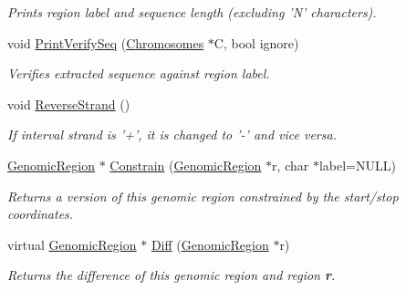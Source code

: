 \begin{CompactItemize}
\begin{CompactList}\small\item\em Prints region label and sequence length (excluding 'N' characters). \item\end{CompactList}\item 
\hypertarget{classGenomicRegion_77fa696d55d538b365d15a7a30391132}{
void \hyperlink{classGenomicRegion_77fa696d55d538b365d15a7a30391132}{PrintVerifySeq} (\hyperlink{classChromosomes}{Chromosomes} $\ast$C, bool ignore)}
\label{classGenomicRegion_77fa696d55d538b365d15a7a30391132}

\begin{CompactList}\small\item\em Verifies extracted sequence against region label. \item\end{CompactList}\item 
\hypertarget{classGenomicRegion_9304039f70c5110b961cc9de77974d09}{
void \hyperlink{classGenomicRegion_9304039f70c5110b961cc9de77974d09}{ReverseStrand} ()}
\label{classGenomicRegion_9304039f70c5110b961cc9de77974d09}

\begin{CompactList}\small\item\em If interval strand is '+', it is changed to '-' and vice versa. \item\end{CompactList}\item 
\hypertarget{classGenomicRegion_50f5ba99404da1cdae6a8632a19ff837}{
\hyperlink{classGenomicRegion}{GenomicRegion} $\ast$ \hyperlink{classGenomicRegion_50f5ba99404da1cdae6a8632a19ff837}{Constrain} (\hyperlink{classGenomicRegion}{GenomicRegion} $\ast$r, char $\ast$label=NULL)}
\label{classGenomicRegion_50f5ba99404da1cdae6a8632a19ff837}

\begin{CompactList}\small\item\em Returns a version of this genomic region constrained by the start/stop coordinates. \item\end{CompactList}\item 
\hypertarget{classGenomicRegion_44cf789afda4e77749019045050e5ec7}{
virtual \hyperlink{classGenomicRegion}{GenomicRegion} $\ast$ \hyperlink{classGenomicRegion_44cf789afda4e77749019045050e5ec7}{Diff} (\hyperlink{classGenomicRegion}{GenomicRegion} $\ast$r)}
\label{classGenomicRegion_44cf789afda4e77749019045050e5ec7}

\begin{CompactList}\small\item\em Returns the difference of this genomic region and region {\bf r}. \item\end{CompactList}\end{CompactItemize}

